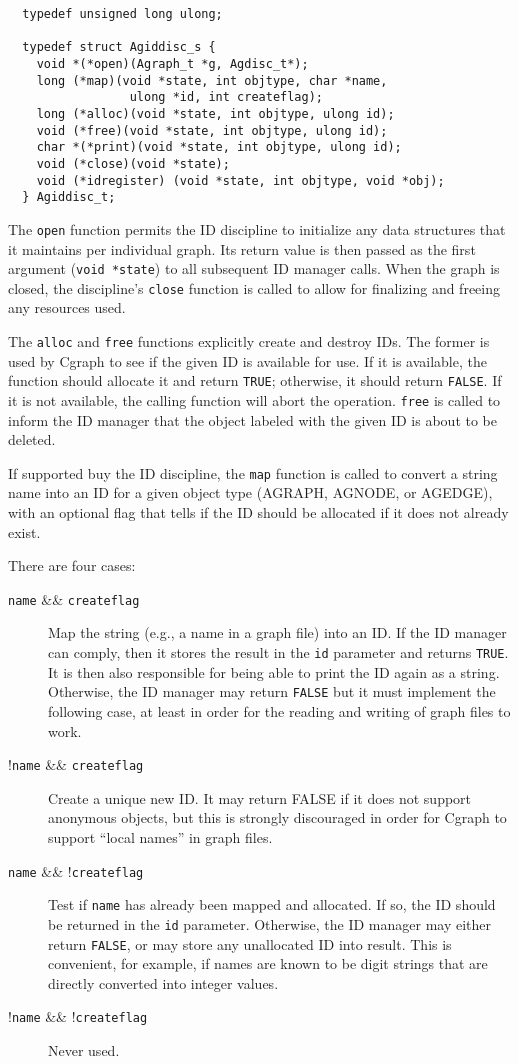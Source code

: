 \documentclass[11pt,letterpaper]{article}
\begin{document}
\begin{verbatim}
  typedef unsigned long ulong;

  typedef struct Agiddisc_s {
    void *(*open)(Agraph_t *g, Agdisc_t*);
    long (*map)(void *state, int objtype, char *name, 
                 ulong *id, int createflag);
    long (*alloc)(void *state, int objtype, ulong id);
    void (*free)(void *state, int objtype, ulong id);
    char *(*print)(void *state, int objtype, ulong id);
    void (*close)(void *state);
    void (*idregister) (void *state, int objtype, void *obj);
  } Agiddisc_t;
\end{verbatim}

The \verb"open" function permits the ID discipline to initialize any data structures that it maintains 
per individual graph. Its return value is then passed as the first argument (\verb"void *state") to all 
subsequent ID manager calls.
When the graph is closed, the discipline's \verb"close" function is called to allow for finalizing and
freeing any resources used.

The \verb"alloc" and \verb"free" functions explicitly create and destroy IDs.  
The former is used by Cgraph to see if the given ID is available for use. If it is available, the function 
should allocate it and return \verb"TRUE"; otherwise, it should return \verb"FALSE".
If it is not available, the calling function will abort the operation.
\verb"free" is called to inform the ID manager that the object labeled with the given ID is about to be
deleted.

If supported buy the ID discipline, the \verb"map" function is called 
to convert a string name into an ID for a given object type 
(AGRAPH, AGNODE, or AGEDGE), with an optional flag that tells if the 
ID should be allocated if it does not already exist. 

There are four cases:
\begin{description}
\item[{\tt name} \&\& {\tt createflag}] 
Map the string (e.g., a name in a graph file) 
into an ID. If the ID manager can comply, then it stores the result 
in the \verb"id" parameter and returns \verb"TRUE". It is then also responsible for
being able to print the ID again as a string. Otherwise, the ID manager 
may return \verb"FALSE" but it must implement the following case, at least 
in order for the reading and writing of graph files to work.
\item[!{\tt name} \&\& {\tt createflag}]  
Create a unique new ID. It may return FALSE if it does not support 
anonymous objects, but this is strongly discouraged
in order for Cgraph to support ``local names'' in graph files.
\item[{\tt name} \&\& !{\tt createflag}]
Test if \verb"name" has already been mapped and allocated. If so, the ID
should be returned in the \verb"id" parameter.
Otherwise, the ID manager may
either return \verb"FALSE", or may store any unallocated ID into result. 
This is convenient, for example, if names
are known to be digit strings that are directly converted into integer values.
\item[!{\tt name} \&\& !{\tt createflag}] Never used.  
\end{description}
\end{document}
